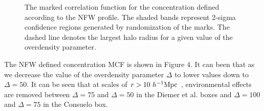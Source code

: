\documentclass[usenatbib,usegraphicx,letterpaper]{mn2e}
\begin{document}
\begin{figure}
	\caption{The marked correlation function for the concentration defined according to the NFW profile. The shaded bands represent 2-sigma confidence regions generated by randomization of the marks. The dashed line denotes the largest halo radius for a given value of the overdensity parameter.}
\end{figure}

The NFW defined concentration MCF is shown in Figure 4. It can been that as we decrease the value of the overdensity parameter $\Delta$ to lower values down to $\Delta = 50$. It can be seen that at scales of $r > 10 \ h^{-1}\mathrm{Mpc}~$, environmental effects are removed between $\Delta = 75$ and $\Delta = 50$ in the Diemer et al. boxes and $\Delta = 100$ and $\Delta =75$ in the Consuelo box.

\begin{figure}
	\centering
	\\

\end{figure}
\end{document}
